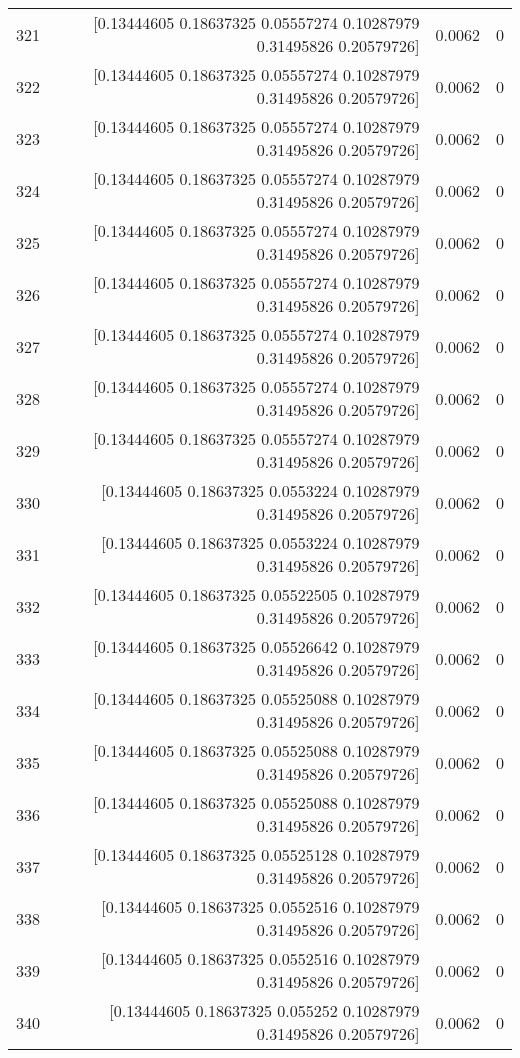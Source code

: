 \begin{longtable}{lrrr}
321 & [0.13444605 0.18637325 0.05557274 0.10287979 0.31495826 0.20579726] & 0.0062 & 0 \\
322 & [0.13444605 0.18637325 0.05557274 0.10287979 0.31495826 0.20579726] & 0.0062 & 0 \\
323 & [0.13444605 0.18637325 0.05557274 0.10287979 0.31495826 0.20579726] & 0.0062 & 0 \\
324 & [0.13444605 0.18637325 0.05557274 0.10287979 0.31495826 0.20579726] & 0.0062 & 0 \\
325 & [0.13444605 0.18637325 0.05557274 0.10287979 0.31495826 0.20579726] & 0.0062 & 0 \\
326 & [0.13444605 0.18637325 0.05557274 0.10287979 0.31495826 0.20579726] & 0.0062 & 0 \\
327 & [0.13444605 0.18637325 0.05557274 0.10287979 0.31495826 0.20579726] & 0.0062 & 0 \\
328 & [0.13444605 0.18637325 0.05557274 0.10287979 0.31495826 0.20579726] & 0.0062 & 0 \\
329 & [0.13444605 0.18637325 0.05557274 0.10287979 0.31495826 0.20579726] & 0.0062 & 0 \\
330 & [0.13444605 0.18637325 0.0553224  0.10287979 0.31495826 0.20579726] & 0.0062 & 0 \\
331 & [0.13444605 0.18637325 0.0553224  0.10287979 0.31495826 0.20579726] & 0.0062 & 0 \\
332 & [0.13444605 0.18637325 0.05522505 0.10287979 0.31495826 0.20579726] & 0.0062 & 0 \\
333 & [0.13444605 0.18637325 0.05526642 0.10287979 0.31495826 0.20579726] & 0.0062 & 0 \\
334 & [0.13444605 0.18637325 0.05525088 0.10287979 0.31495826 0.20579726] & 0.0062 & 0 \\
335 & [0.13444605 0.18637325 0.05525088 0.10287979 0.31495826 0.20579726] & 0.0062 & 0 \\
336 & [0.13444605 0.18637325 0.05525088 0.10287979 0.31495826 0.20579726] & 0.0062 & 0 \\
337 & [0.13444605 0.18637325 0.05525128 0.10287979 0.31495826 0.20579726] & 0.0062 & 0 \\
338 & [0.13444605 0.18637325 0.0552516  0.10287979 0.31495826 0.20579726] & 0.0062 & 0 \\
339 & [0.13444605 0.18637325 0.0552516  0.10287979 0.31495826 0.20579726] & 0.0062 & 0 \\
340 & [0.13444605 0.18637325 0.055252   0.10287979 0.31495826 0.20579726] & 0.0062 & 0 \\

\end{longtable}
